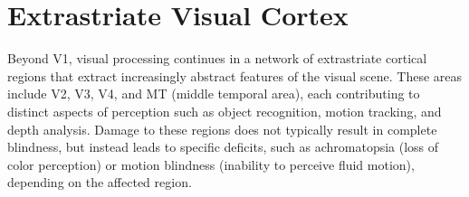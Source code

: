 \section{Extrastriate Visual Cortex}
\label{sec:extrastriate}
Beyond V1, visual processing continues in a network of extrastriate cortical regions
that extract increasingly abstract features of the visual scene. These areas include
V2, V3, V4, and MT (middle temporal area), each contributing to distinct aspects of
perception such as object recognition, motion tracking, and depth analysis. Damage
to these regions does not typically result in complete blindness, but instead leads to
specific deficits, such as achromatopsia (loss of color perception) or motion blindness
(inability to perceive fluid motion), depending on the affected region.
